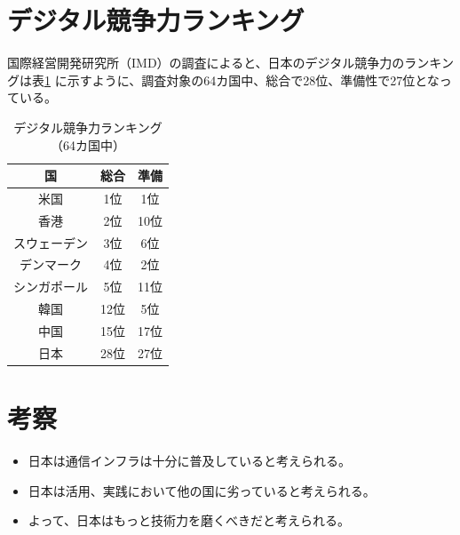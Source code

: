 \documentclass[a4paper,11pt,dvipdfmx]{ujarticle}
\begin{document}
\section{デジタル競争力ランキング}
国際経営開発研究所（IMD）の調査\cite{imd}によると、日本のデジタル競争力のランキングは表\ref{tab:ranking}
に示すように、調査対象の64カ国中、総合で28位、準備性で27位となっている。
\begin{table}[htbp]
    \centering
    \caption{デジタル競争力ランキング（64カ国中）}
    \label{tab:ranking}
    \begin{tabular}{|c|c|c|}
        \hline
        国 & 総合 & 準備 \\ \hline
    米国 & 1位 & 1位 \\ \hline
    香港 & 2位 & 10位 \\ \hline
    スウェーデン & 3位 & 6位 \\ \hline
    デンマーク & 4位 & 2位 \\ \hline
    シンガポール & 5位 & 11位 \\ \hline\hline
    韓国 & 12位 & 5位 \\ \hline
    中国 & 15位 & 17位 \\ \hline\hline
    日本 & 28位 & 27位 \\ \hline
    \end{tabular}
\end{table}
\section{考察}
\begin{itemize}
    \item 日本は通信インフラは十分に普及していると考えられる。
    \item 日本は活用、実践において他の国に劣っていると考えられる。
    \item よって、日本はもっと技術力を磨くべきだと考えられる。
\end{itemize}
%


\end{document}
